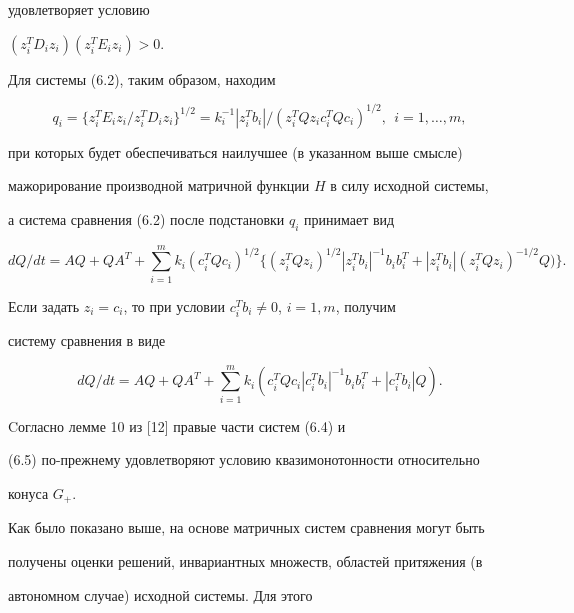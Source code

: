 удовлетворяет условию 


$(z_i^T D_i z_i)(z_i^T E_i z_i)>0$. 


 


Для системы (6.2), таким образом, находим 


$$ 


q_i=\{z^T_i E_i z_i/z^T_i D_i z_i\}^{1/2}= 


k^{-1}_i|z^T_i b_i|/(z^T_i Q z_i c^T_i Q c_i)^{1/2}, 


\ \ i=1,\dotsc,m, 


$$ 


при которых будет обеспечиваться наилучшее (в указанном выше смысле) 


мажорирование производной матричной функции $H$ в силу исходной системы, 


а система сравнения (6.2) после подстановки $q_i$ принимает вид 


\begin{equation} 


d Q/d t=A Q+Q A^T+\sum^m_{i=1}k_i(c^T_i Q c_i)^{1/2} 


\{(z^T_i Q z_i)^{1/2}|z^T_i b_i|^{-1}b_i b^T_i+ 


|z^T_i b_i|(z^T_i Q z_i)^{-1/2}Q)\}. 


\end{equation} 


Если задать $z_i=c_i$, то при условии $c^T_i b_i\ne0$, $i=1,m$, получим 


систему сравнения в виде 


\begin{equation} 


d Q/d t=A Q+Q A^T+\sum^m_{i=1}k_i(c^T_i Q c_i 


|c^T_i b_i|^{-1}b_i b^T_i+|c^T_i b_i|Q). 


\end{equation} 


Cогласно лемме 10 из [12] правые части систем (6.4) и 


(6.5) по-прежнему удовлетворяют условию квазимонотонности относительно 


конуса $G_+$. 


 


Как было показано выше, на основе матричных систем сравнения могут быть 


получены оценки решений, инвариантных множеств, областей притяжения (в 


автономном случае) исходной системы. Для этого 


